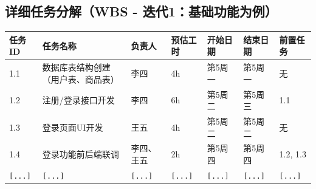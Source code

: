 \documentclass[12pt]{ctexart}
\begin{document}
\subsection{详细任务分解（WBS - 迭代1：基础功能为例）}
\begin{center}
\begin{tabular}{|p{1.5cm}|p{3cm}|p{2cm}|p{1.5cm}|p{2cm}|p{2cm}|p{2cm}|}
\hline
\textbf{任务ID} & \textbf{任务名称} & \textbf{负责人} & \textbf{预估工时} & \textbf{开始日期} & \textbf{结束日期} & \textbf{前置任务} \\
\hline
1.1 & 数据库表结构创建（用户表、商品表） & 李四 & 4h & 第5周一 & 第5周一 & 无 \\
\hline
1.2 & 注册/登录接口开发 & 李四 & 6h & 第5周二 & 第5周三 & 1.1 \\
\hline
1.3 & 登录页面UI开发 & 王五 & 4h & 第5周二 & 第5周二 & 无 \\
\hline
1.4 & 登录功能前后端联调 & 李四、王五 & 2h & 第5周四 & 第5周四 & 1.2, 1.3 \\
\hline
\texttt{[...]} & \texttt{[...]} & \texttt{[...]} & \texttt{[...]} & \texttt{[...]} & \texttt{[...]} & \texttt{[...]} \\
\hline
\end{tabular}
\end{center}

\end{document}

